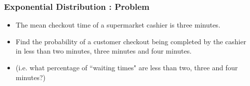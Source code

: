 \documentclass[MAIN.tex]{subfiles}
\begin{document}
%
%
%
%
%
\begin{frame}[fragile]
	\frametitle{Exponential Distribution : Problem}
	\large
\begin{itemize}

\item The mean checkout time of a supermarket cashier is three minutes. 
\item Find the probability of a customer checkout being completed by the cashier in less than two minutes, three minutes and four minutes. 
\item (i.e. what percentage of ``waiting times" are less than two, three and four minutes?)
\end{itemize}
\end{frame}
\end{document}
